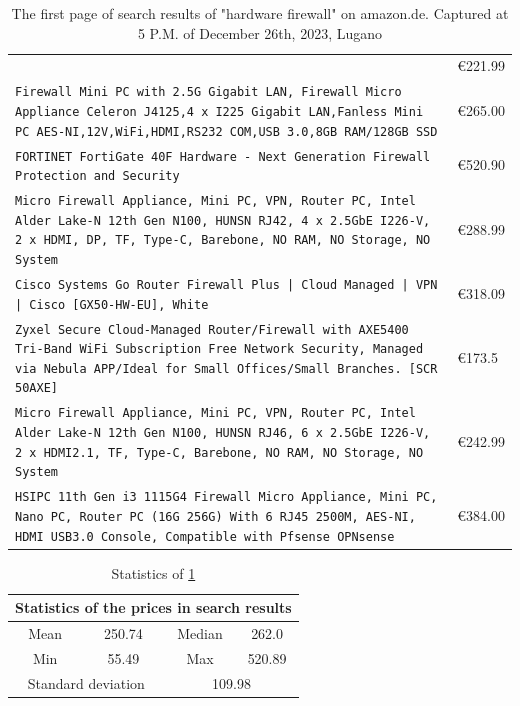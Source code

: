 \documentclass[mscthesis]{usiinfthesis}
\begin{document}
\begin{table}[H]
\begin{tabular}{|p{113mm}|p{12mm}|}
{    }    & €221.99 \\
    \texttt{Firewall Mini PC with 2.5G Gigabit LAN, Firewall Micro Appliance Celeron J4125,4 x I225 Gigabit LAN,Fanless Mini PC AES-NI,12V,WiFi,HDMI,RS232 COM,USB 3.0,8GB RAM/128GB SSD
    }    & €265.00 \\
    \texttt{FORTINET FortiGate 40F Hardware - Next Generation Firewall Protection and Security
    }    & €520.90 \\
    \texttt{Micro Firewall Appliance, Mini PC, VPN, Router PC, Intel Alder Lake-N 12th Gen N100, HUNSN RJ42, 4 x 2.5GbE I226-V, 2 x HDMI, DP, TF, Type-C, Barebone, NO RAM, NO Storage, NO System
    }    & €288.99 \\
    \texttt{Cisco Systems Go Router Firewall Plus | Cloud Managed | VPN | Cisco [GX50-HW-EU], White
    }    & €318.09 \\
    \texttt{Zyxel Secure Cloud-Managed Router/Firewall with AXE5400 Tri-Band WiFi Subscription Free Network Security, Managed via Nebula APP/Ideal for Small Offices/Small Branches. [SCR 50AXE]
    }    & €173.5  \\
    \texttt{Micro Firewall Appliance, Mini PC, VPN, Router PC, Intel Alder Lake-N 12th Gen N100, HUNSN RJ46, 6 x 2.5GbE I226-V, 2 x HDMI2.1, TF, Type-C, Barebone, NO RAM, NO Storage, NO System
    }    & €242.99 \\
    \texttt{HSIPC 11th Gen i3 1115G4 Firewall Micro Appliance, Mini PC, Nano PC, Router PC (16G 256G) With 6 RJ45 2500M, AES-NI, HDMI USB3.0 Console, Compatible with Pfsense OPNsense
    }    & €384.00 \\
    \hline
  \end{tabular}
  \caption{The first page of search results of "hardware firewall" on amazon.de. Captured at 5 P.M. of December 26th, 2023, Lugano}
  \label{tab:amazon-search}
\end{table}

\begin{table}[H]
  \centering
  \begin{tabular}{|c|c|c|c|}
    \hline
    \multicolumn{4}{|c|}{Statistics of the prices in search results}                         \\
    \hline
    Mean                                     & 250.74                      & Median & 262.0  \\
    \hline
    Min                                      & 55.49                       & Max    & 520.89 \\
    \hline
    \multicolumn{2}{|c|}{Standard deviation} & \multicolumn{2}{c|}{109.98}                   \\
    \hline
  \end{tabular}
  \caption{Statistics of \cref{tab:amazon-search}}
  \label{tab:amazon-search-stat}
\end{table}
\end{document}
